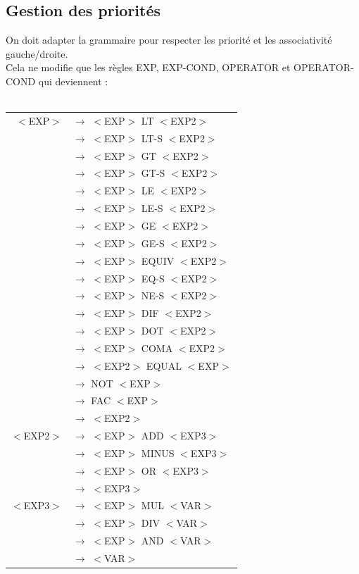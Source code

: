 \documentclass[a4paper,10pt]{article}
\begin{document}
\subsection{Gestion des priorités}

On doit adapter la grammaire pour respecter les priorité et les associativité gauche/droite.\\
Cela ne modifie que les règles EXP, EXP-COND, OPERATOR et OPERATOR-COND qui deviennent : \\
~\\



\begin{tabular}{rl}


$<$EXP$>$			& $\rightarrow$ $<$EXP$>$ LT $<$EXP2$>$\\
					& $\rightarrow$ $<$EXP$>$ LT-S $<$EXP2$>$\\
					& $\rightarrow$ $<$EXP$>$ GT $<$EXP2$>$\\
					& $\rightarrow$ $<$EXP$>$ GT-S $<$EXP2$>$\\
					& $\rightarrow$ $<$EXP$>$ LE $<$EXP2$>$\\
					& $\rightarrow$ $<$EXP$>$ LE-S $<$EXP2$>$\\
					& $\rightarrow$ $<$EXP$>$ GE $<$EXP2$>$\\
					& $\rightarrow$ $<$EXP$>$ GE-S $<$EXP2$>$\\
					& $\rightarrow$ $<$EXP$>$ EQUIV $<$EXP2$>$\\
					& $\rightarrow$ $<$EXP$>$ EQ-S $<$EXP2$>$\\
					& $\rightarrow$ $<$EXP$>$ NE-S $<$EXP2$>$\\
					& $\rightarrow$ $<$EXP$>$ DIF $<$EXP2$>$\\
					& $\rightarrow$ $<$EXP$>$ DOT $<$EXP2$>$\\
					& $\rightarrow$ $<$EXP$>$ COMA $<$EXP2$>$\\
					& $\rightarrow$ $<$EXP2$>$ EQUAL $<$EXP$>$\\
					& $\rightarrow$ NOT $<$EXP$>$ \\
					& $\rightarrow$ FAC $<$EXP$>$ \\
					& $\rightarrow$ $<$EXP2$>$ \\
										
					
$<$EXP2$>$			& $\rightarrow$ $<$EXP$>$ ADD $<$EXP3$>$\\
					& $\rightarrow$ $<$EXP$>$ MINUS $<$EXP3$>$\\
					& $\rightarrow$ $<$EXP$>$ OR $<$EXP3$>$\\
					& $\rightarrow$ $<$EXP3$>$\\
					
$<$EXP3$>$			& $\rightarrow$ $<$EXP$>$ MUL $<$VAR$>$\\
					& $\rightarrow$ $<$EXP$>$ DIV $<$VAR$>$\\
					& $\rightarrow$ $<$EXP$>$ AND $<$VAR$>$\\
					& $\rightarrow$ $<$VAR$>$\\
\end{tabular}
\end{document}
